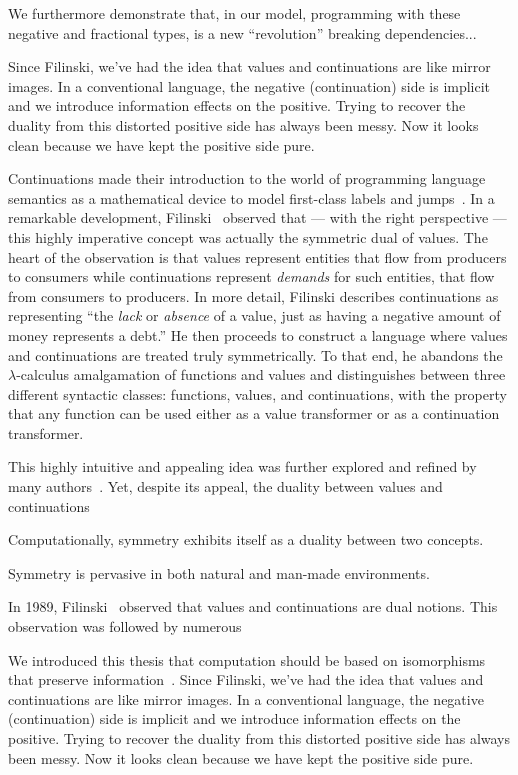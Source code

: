 \documentclass[preprint]{sigplanconf}
\begin{document}
We furthermore demonstrate that, in our model,
programming with these negative and fractional types, is a new ``revolution''
breaking dependencies...

Since Filinski, we've had the
idea that values and continuations are like mirror images. In a conventional
language, the negative (continuation) side is implicit and we introduce
information effects on the positive. Trying to recover the duality from this
distorted positive side has always been messy. Now it looks clean because we
have kept the positive side pure.

Continuations made their introduction to the world of programming language
semantics as a mathematical device to model first-class labels and
jumps~\cite{springerlink:10.1023/A:1010026413531}. In a remarkable
development, Filinski~\cite{Filinski:1989:DCI:648332.755574} observed that
--- with the right perspective --- this highly imperative concept was
actually the symmetric dual of values. The heart of the observation is that
values represent entities that flow from producers to consumers while
continuations represent \emph{demands} for such entities, that flow from
consumers to producers. In more detail, Filinski describes continuations as
representing ``the \emph{lack} or \emph{absence} of a value, just as having a
negative amount of money represents a debt.'' He then proceeds to construct a
language where values and continuations are treated truly symmetrically. To
that end, he abandons the $\lambda$-calculus amalgamation of functions and
values and distinguishes between three different syntactic classes:
functions, values, and continuations, with the property that any function can
be used either as a value transformer or as a continuation transformer.

This highly intuitive and appealing idea was further explored and refined by
many authors~\cite{Griffin:1989:FNC:96709.96714, Curien:2000,
  Wadler:2003, DBLP:conf/rta/Wadler05}. Yet, despite its appeal, the duality
between values and continuations 

Computationally, symmetry exhibits itself as a duality between two concepts.

Symmetry is pervasive in both natural and man-made environments. 

In 1989, Filinski~\cite{Filinski:1989:DCI:648332.755574} observed that values
and continuations are dual notions. This observation was followed by numerous

We introduced this thesis that computation should be based on isomorphisms
that preserve information~\cite{infeffects}. Since Filinski, we've had the
idea that values and continuations are like mirror images. In a conventional
language, the negative (continuation) side is implicit and we introduce
information effects on the positive. Trying to recover the duality from this
distorted positive side has always been messy. Now it looks clean because we
have kept the positive side pure.
\end{document}
